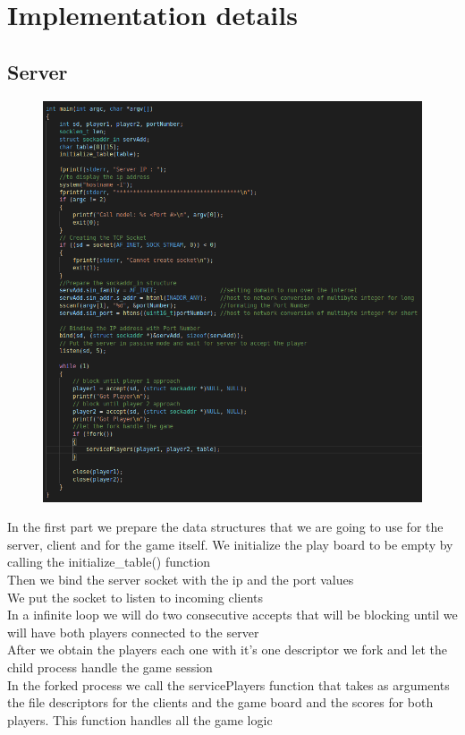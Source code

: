 \documentclass{article}
\begin{document}
\section{Implementation details}
\subsection{Server}
\clearpage
\begin{figure}[h!]
    \centering
    \includegraphics[width=1.3\textwidth,height=\textheight,keepaspectratio]{server_code.png}
\end{figure}


In the first part we prepare the data structures that we are going to use for the server, client and for the game itself.
We initialize the play board to be empty by calling the initialize\_table() function
\\Then we bind the server socket with the ip and the port values
\\We put the socket to listen to incoming clients
\\In a infinite loop we will do two consecutive accepts that will be blocking until we will have both players connected to the server
\\After we obtain the players each one with it's one descriptor we fork and let the child process handle the game session
\\In the forked process we call the servicePlayers function that takes as arguments the file descriptors for the clients and the game board and the scores for both players. This function  handles all the game logic
\end{document}

